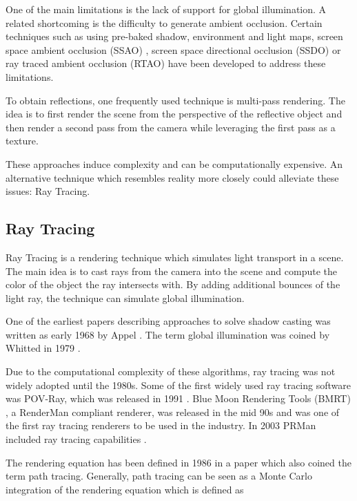 One of the main limitations is the lack of support for global illumination. A related shortcoming is the difficulty to generate ambient occlusion. Certain techniques such as using pre-baked shadow, environment and light maps, screen space ambient occlusion (SSAO) \cite{bavoil2008ssao}, screen space directional occlusion (SSDO) \cite{ritschel2009ssdo} or ray traced ambient occlusion (RTAO) \cite{gautron2020rtao} have been developed to address these limitations.

To obtain reflections, one frequently used technique is multi-pass rendering. The idea is to first render the scene from the perspective of the reflective object and then render a second pass from the camera while leveraging the first pass as a texture.

These approaches induce complexity and can be computationally expensive. An alternative technique which resembles reality more closely could alleviate these issues: Ray Tracing.

\subsection{Ray Tracing}

Ray Tracing is a rendering technique which simulates light transport in a scene. The main idea is to cast rays from the camera into the scene and compute the color of the object the ray intersects with. By adding additional bounces of the light ray, the technique can simulate global illumination.

One of the earliest papers describing approaches to solve shadow casting was written as early 1968 by Appel \cite{appel1968shading}. The term global illumination was coined by Whitted in 1979 \cite{whitted2020OriginsOfGlobalIllumination}.

Due to the computational complexity of these algorithms, ray tracing was not widely adopted until the 1980s. Some of the first widely used ray tracing software was POV-Ray, which was released in 1991 \cite{POV_Ray_Documentation}. Blue Moon Rendering Tools (BMRT) \cite{bmrt}, a RenderMan compliant renderer, was released in the mid 90s and was one of the first ray tracing renderers to be used in the industry. In 2003 PRMan included ray tracing capabilities \cite{RenderMan_11_Release_Notes}.

The rendering equation has been defined in 1986 in a paper which also coined the term path tracing. Generally, path tracing can be seen as a Monte Carlo integration of the rendering equation which is defined as

